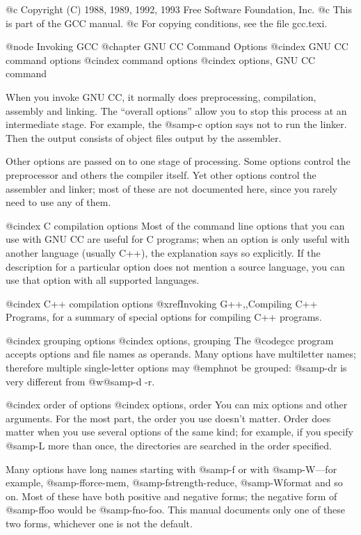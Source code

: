 @c Copyright (C) 1988, 1989, 1992, 1993 Free Software Foundation, Inc.
@c This is part of the GCC manual.
@c For copying conditions, see the file gcc.texi.

@node Invoking GCC
@chapter GNU CC Command Options
@cindex GNU CC command options
@cindex command options
@cindex options, GNU CC command

When you invoke GNU CC, it normally does preprocessing, compilation,
assembly and linking.  The ``overall options'' allow you to stop this
process at an intermediate stage.  For example, the @samp{-c} option
says not to run the linker.  Then the output consists of object files
output by the assembler.

Other options are passed on to one stage of processing.  Some options
control the preprocessor and others the compiler itself.  Yet other
options control the assembler and linker; most of these are not
documented here, since you rarely need to use any of them.

@cindex C compilation options
Most of the command line options that you can use with GNU CC are useful
for C programs; when an option is only useful with another language
(usually C++), the explanation says so explicitly.  If the description
for a particular option does not mention a source language, you can use
that option with all supported languages.

@cindex C++ compilation options
@xref{Invoking G++,,Compiling C++ Programs}, for a summary of special
options for compiling C++ programs.

@cindex grouping options
@cindex options, grouping
The @code{gcc} program accepts options and file names as operands.  Many
options have multiletter names; therefore multiple single-letter options
may @emph{not} be grouped: @samp{-dr} is very different from @w{@samp{-d
-r}}.

@cindex order of options
@cindex options, order
You can mix options and other arguments.  For the most part, the order
you use doesn't matter.  Order does matter when you use several options
of the same kind; for example, if you specify @samp{-L} more than once,
the directories are searched in the order specified.

Many options have long names starting with @samp{-f} or with
@samp{-W}---for example, @samp{-fforce-mem},
@samp{-fstrength-reduce}, @samp{-Wformat} and so on.  Most of
these have both positive and negative forms; the negative form of
@samp{-ffoo} would be @samp{-fno-foo}.  This manual documents
only one of these two forms, whichever one is not the default.

